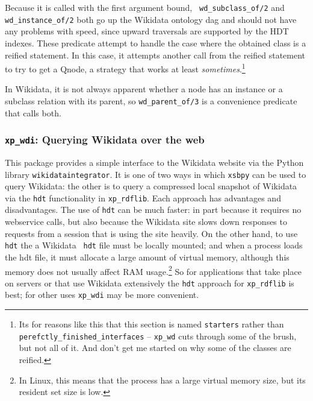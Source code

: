 \begin{description}
%
Because it is called with the first argument bound, {\tt
  wd\_subclass\_of/2} and {\tt wd\_instance\_of/2} both go up the
Wikidata ontology dag and should not have any problems with speed,
since upward traversals are supported by the HDT indexes.  These
predicate attempt to handle the case where the obtained class is a
reified statement.  In this case, it attempts another call from the
reified statement to try to get a Qnode, a strategy that works at
least {\em sometimes}.\footnote{Its for reasons like this that this
section is named {\tt starters} rather than {\tt
  perefctly\_finished\_interfaces} -- {\tt xp\_wd} cuts through some
of the brush, but not all of it.  And don't get me started on why some
of the classes are reified.}

In Wikidata, it is not always apparent whether a node has an instance
or a subclass relation with its parent, so {\tt wd\_parent\_of/3} is a
convenience predicate that calls both.

\end{description}

\subsubsection{{\tt xp\_wdi}: Querying Wikidata over the web}

This package provides a simple interface to the Wikidata website via
the Python library {\tt wikidataintegrator}.  It is one of two ways in
which {\tt xsbpy} can be used to query Wikidata: the other is to query
a compressed local snapshot of Wikidata via the {\tt hdt}
functionality in {\tt xp\_rdflib}.  Each approach has advantages and
disadvantages.  The use of {\tt hdt} can be much faster: in part
because it requires no webservice calls, but also because the Wikidata
site slows down responses to requests from a session that is using the
site heavily.  On the other hand, to use {\tt hdt} the a Wikidata {\tt
  hdt} file must be locally mounted; and when a process loads the hdt
file, it must allocate a large amount of virtual memory, although this
memory does not usually affect RAM usage.\footnote{In Linux, this
  means that the process has a large virtual memory size, but its
  resident set size is low.}  So for applications that take place on
servers or that use Wikidata extensively the {\tt hdt} approach for
{\tt xp\_rdflib} is best; for other uses {\tt xp\_wdi} may be more
convenient.

